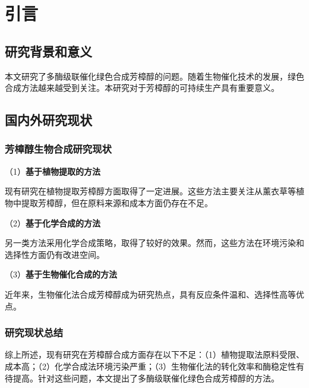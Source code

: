 \section{引言}

\subsection{研究背景和意义}


本文研究了多酶级联催化绿色合成芳樟醇的问题。随着生物催化技术的发展，绿色合成方法越来越受到关注。本研究对于芳樟醇的可持续生产具有重要意义。

\subsection{国内外研究现状}

\subsubsection{芳樟醇生物合成研究现状}


（1）\textbf{基于植物提取的方法}

现有研究在植物提取芳樟醇方面取得了一定进展\cite{dudareva2013biosynthesis}。这些方法主要关注从薰衣草等植物中提取芳樟醇，但在原料来源和成本方面仍存在不足。

（2）\textbf{基于化学合成的方法}

另一类方法采用化学合成策略\cite{peralta2012identification}，取得了较好的效果。然而，这些方法在环境污染和选择性方面仍有改进空间。

（3）\textbf{基于生物催化合成的方法}

近年来，生物催化法合成芳樟醇成为研究热点\cite{caron2019biosynthesis}，具有反应条件温和、选择性高等优点。

\subsubsection{研究现状总结}


综上所述，现有研究在芳樟醇合成方面存在以下不足：（1）植物提取法原料受限、成本高；（2）化学合成法环境污染严重；（3）生物催化法的转化效率和酶稳定性有待提高。针对这些问题，本文提出了多酶级联催化绿色合成芳樟醇的方法。

